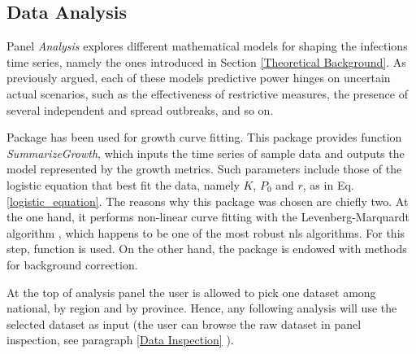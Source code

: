 \documentclass[
12pt, %
a4paper, %
oneside, %
headinclude,footinclude, %
BCOR5mm, %
]{scrartcl}
\begin{document}
\subsection{Data Analysis}\label{sub:Data Analysis}

Panel \textit{Analysis} explores different mathematical models for shaping the infection\textquotesingle s time series, namely the ones introduced in Section \ref{Theoretical Background}. As previously argued, each of these model\textquotesingle s predictive power hinges on uncertain actual scenarios, such as the effectiveness of restrictive measures, the presence of several independent and spread outbreaks, and so on.

Package  \cite{growthcurver} has been used for growth curve fitting. This package provides function  \textit{SummarizeGrowth}, which inputs the time series of sample data and outputs the model represented by the growth metrics. Such parameters include those of the logistic equation that best fit the data, namely $K$, $P_0$ and $r$, as in Eq.\ref{logistic_equation}.
The reasons why this package was chosen are chiefly two. At the one hand, it performs non-linear curve fitting with the Levenberg-Marquardt algorithm \cite{more1978levenberg} , which happens to be one of the most robust nls algorithms. For this step, function \cite{nlsLM}  is used. On the other hand, the package is endowed with methods for background correction.


At the top of analysis panel the user is allowed to pick one dataset among national, by region and by province. Hence, any following analysis will use the selected dataset as input (the user can browse the raw dataset in panel inspection, see paragraph \ref{Data Inspection} ).
\end{document}
